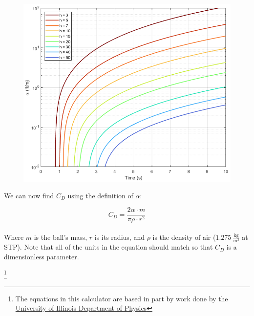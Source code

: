 \documentclass[a4paper]{article}
\newcommand\blfootnote[1]{%
	\begingroup
	\renewcommand\thefootnote{}\footnote{#1}%
	\addtocounter{footnote}{-1}%
	\endgroup
}
\begin{document}
	\begin{figure}[H]
		\centering
		\includegraphics[width=\linewidth]{projectile_drag}
	\end{figure}
	
	We can now find $ C_D $ using the definition of $ \alpha $:
	
	\begin{equation}
		C_D = \frac{2\alpha \cdot m}{\pi \rho \cdot r^2}
	\end{equation}
	\\
	Where $ m $ is the ball's mass, $ r $ is its radius, and $ \rho $ is the density of air ($ 1.275\ \frac{\text{kg}}{\text{m}^3} $ at STP). Note that all of the units in the equation should match so that $ C_D $ is a dimensionless parameter.
	
	
	\blfootnote{The equations in this calculator are based in part by work done by the \href{http://baseball.physics.illinois.edu/ajpfeb08.pdf}{University of Illinois Department of Physics}}
	
	
	
\end{document}
